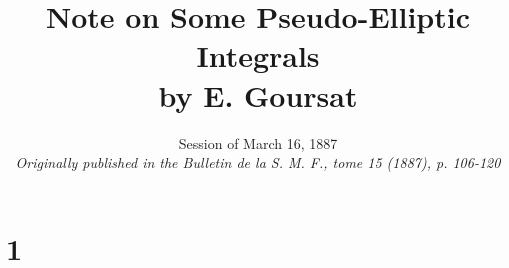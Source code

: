 \documentclass[11pt]{article}
\begin{document}
\title{\textbf{Note on Some Pseudo-Elliptic Integrals} \\ \large{\textnormal{by E. Goursat}}}
\author{}
\date{Session of March 16, 1887 \\ \textit{\small{Originally published in the Bulletin de la S. M. F., tome 15 (1887), p. 106-120}}}
\maketitle

\theoremstyle{definition}
\newtheorem{definition}{Definition}
\newtheorem*{theorem*}{Theorem}
\newtheorem{theorem}{Theorem}
\newcommand{\Fcal}{\mathfrak{F}}

\section*{1}
\end{document}
